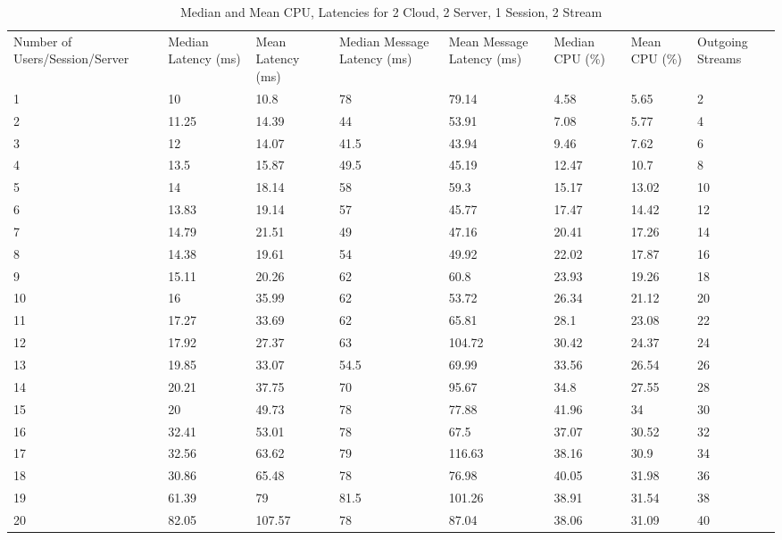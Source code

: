 \begin{table}
\caption{Median and Mean CPU, Latencies for 2 Cloud, 2 Server, 1 Session, 2 Stream}
\label{table:2cld_2serv_1sess_2str}
\begin{tabu} to\linewidth{|X[c]|X[c]|X[c]|X[c]|X[c]|X[c]|X[c]|X[c]|}
\everyrow{\hline}
\hline
Number of Users/Session/Server & Median Latency (ms) & Mean Latency (ms) & Median Message Latency (ms) & Mean Message Latency (ms) & Median CPU (\%) & Mean CPU (\%) & Outgoing Streams\\
1 & 10 & 10.8 & 78 & 79.14 & 4.58 & 5.65 & 2 \\
2 & 11.25 & 14.39 & 44 & 53.91 & 7.08 & 5.77 & 4 \\
3 & 12 & 14.07 & 41.5 & 43.94 & 9.46 & 7.62 & 6 \\
4 & 13.5 & 15.87 & 49.5 & 45.19 & 12.47 & 10.7 & 8 \\
5 & 14 & 18.14 & 58 & 59.3 & 15.17 & 13.02 & 10 \\
6 & 13.83 & 19.14 & 57 & 45.77 & 17.47 & 14.42 & 12 \\
7 & 14.79 & 21.51 & 49 & 47.16 & 20.41 & 17.26 & 14 \\
8 & 14.38 & 19.61 & 54 & 49.92 & 22.02 & 17.87 & 16 \\
9 & 15.11 & 20.26 & 62 & 60.8 & 23.93 & 19.26 & 18 \\
10 & 16 & 35.99 & 62 & 53.72 & 26.34 & 21.12 & 20 \\
11 & 17.27 & 33.69 & 62 & 65.81 & 28.1 & 23.08 & 22 \\
12 & 17.92 & 27.37 & 63 & 104.72 & 30.42 & 24.37 & 24 \\
13 & 19.85 & 33.07 & 54.5 & 69.99 & 33.56 & 26.54 & 26 \\
14 & 20.21 & 37.75 & 70 & 95.67 & 34.8 & 27.55 & 28 \\
15 & 20 & 49.73 & 78 & 77.88 & 41.96 & 34 & 30 \\
16 & 32.41 & 53.01 & 78 & 67.5 & 37.07 & 30.52 & 32 \\
17 & 32.56 & 63.62 & 79 & 116.63 & 38.16 & 30.9 & 34 \\
18 & 30.86 & 65.48 & 78 & 76.98 & 40.05 & 31.98 & 36 \\
19 & 61.39 & 79 & 81.5 & 101.26 & 38.91 & 31.54 & 38 \\
20 & 82.05 & 107.57 & 78 & 87.04 & 38.06 & 31.09 & 40 \\
\end{tabu}
\end{table}


